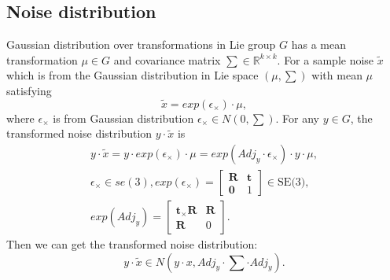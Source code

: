 \documentclass[journal]{IEEEtran}
\begin{document}
\subsection{Noise distribution}
Gaussian distribution over transformations in Lie group $G$ has a mean transformation $\mu \in G$ and covariance matrix $\sum \in \mathbb{R}^{k \times k}$\cite{Eade:2013um}. For a sample noise $\tilde{x}$ which is from the Gaussian distribution in Lie space $(\mu,\sum)$ with mean $\mu$ satisfying
\begin{equation}\label{36}
\tilde{x} = exp(\epsilon_{\times}) \cdot \mu,
\end{equation}
where $\epsilon_{\times}$ is from Gaussian distribution $\epsilon_{\times} \in N(0,\sum)$. For any $y\in G$, the transformed noise distribution $y \cdot \tilde{x}$ is
\begin{equation}\label{37}
\begin{array}{lll}
y \cdot \tilde{x} = y \cdot exp(\epsilon_{\times}) \cdot \mu = exp(Adj_y \cdot \epsilon_{\times}) \cdot y \cdot \mu,\\
\epsilon_{\times} \in se(3), exp(\epsilon_{\times}) = \left[\begin{array}{cc}
    \mathbf{R}  & \mathbf{t} \\
    \mathbf{0}  &  1
    \end{array}\right] \in \text{SE(3)},\\
exp(Adj_y) = \left[\begin{array}{cc}
    \mathbf{t_\times R}  & \mathbf{R} \\
    \mathbf{R}  &  0
    \end{array}\right].
\end{array}
\end{equation}
Then we can get the transformed noise distribution:
\begin{equation}\label{38}
y \cdot \tilde{x} \in N(y \cdot x, Adj_y \cdot \sum \cdot  Adj_y).
\end{equation}
\end{document}
